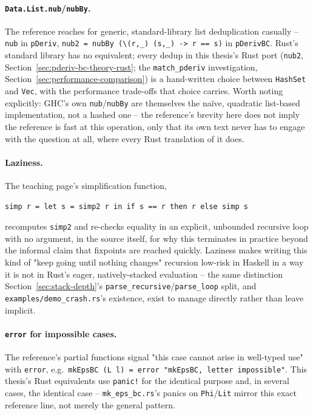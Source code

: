 \paragraph{\texttt{Data.List.nub}/\texttt{nubBy}.} The reference reaches
for generic, standard-library list deduplication casually --
\texttt{nub} in \texttt{pDeriv}, \texttt{nub2 = nubBy (\textbackslash(r,\_) (s,\_) -> r == s)}
in \texttt{pDerivBC}. Rust's standard library has no equivalent; every
dedup in this thesis's Rust port (\texttt{nub2},
Section~\ref{sec:pderiv-bc-theory-rust}; the \texttt{match\_pderiv}
investigation, Section~\ref{sec:performance-comparison}) is a
hand-written choice between \texttt{HashSet} and \texttt{Vec}, with the
performance trade-offs that choice carries. Worth noting explicitly:
GHC's own \texttt{nub}/\texttt{nubBy} are themselves the na\"ive,
quadratic list-based implementation, not a hashed one -- the reference's
brevity here does not imply the reference is fast at this operation, only
that its own text never has to engage with the question at all, where
every Rust translation of it does.

\paragraph{Laziness.} The teaching page's simplification function,
\begin{verbatim}
simp r = let s = simp2 r in if s == r then r else simp s
\end{verbatim}
recomputes \texttt{simp2} and re-checks equality in an explicit,
unbounded recursive loop with no argument, in the source itself, for why
this terminates in practice beyond the informal claim that fixpoints are
reached quickly. Laziness makes writing this kind of "keep going until
nothing changes" recursion low-risk in Haskell in a way it is not in
Rust's eager, natively-stacked evaluation -- the same distinction
Section~\ref{sec:stack-depth}'s \texttt{parse\_recursive}/\texttt{parse\_loop}
split, and \texttt{examples/demo\_crash.rs}'s existence, exist to manage
directly rather than leave implicit.

\paragraph{\texttt{error} for impossible cases.} The reference's partial
functions signal "this case cannot arise in well-typed use" with
\texttt{error}, e.g.\ \texttt{mkEpsBC (L l) = error "mkEpsBC, letter impossible"}.
This thesis's Rust equivalents use \texttt{panic!} for the identical
purpose and, in several cases, the identical case -- \texttt{mk\_eps\_bc.rs}'s
panics on \texttt{Phi}/\texttt{Lit} mirror this exact reference line, not
merely the general pattern.

